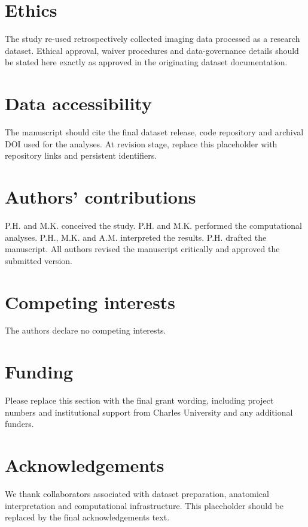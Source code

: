 \documentclass[fleqn,usenatbib]{rsproca_new}
\begin{document}
\section{Ethics}
The study re-used retrospectively collected imaging data processed as a research dataset. Ethical approval, waiver procedures and data-governance details should be stated here exactly as approved in the originating dataset documentation.

\section{Data accessibility}
The manuscript should cite the final dataset release, code repository and archival DOI used for the analyses. At revision stage, replace this placeholder with repository links and persistent identifiers.

\section{Authors' contributions}
P.H. and M.K. conceived the study. P.H. and M.K. performed the computational analyses. P.H., M.K. and A.M. interpreted the results. P.H. drafted the manuscript. All authors revised the manuscript critically and approved the submitted version.

\section{Competing interests}
The authors declare no competing interests.

\section{Funding}
Please replace this section with the final grant wording, including project numbers and institutional support from Charles University and any additional funders.

\section{Acknowledgements}
We thank collaborators associated with dataset preparation, anatomical interpretation and computational infrastructure. This placeholder should be replaced by the final acknowledgements text.



\end{document}
